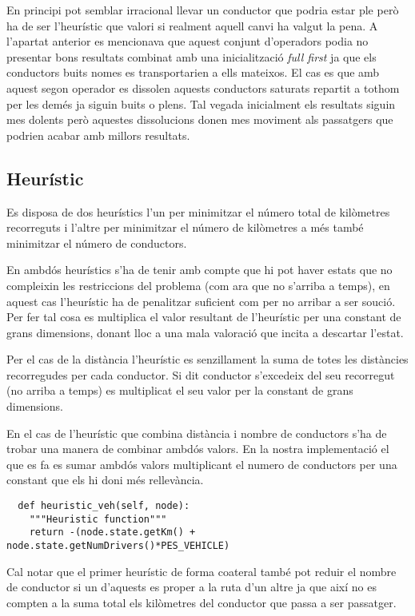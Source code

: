 En principi pot semblar irracional llevar un conductor que podria estar ple però ha de ser l'heurístic
que valori si realment aquell canvi ha valgut la pena.
A l'apartat anterior es mencionava que aquest conjunt d'operadors podia no presentar bons resultats
combinat amb una inicialització \emph{full first} ja que els conductors buits nomes es transportarien
a ells mateixos. El cas es que amb aquest segon operador es dissolen aquests conductors saturats
repartit a tothom per les demés ja siguin buits o plens. Tal vegada inicialment els resultats siguin
mes dolents però aquestes dissolucions donen mes moviment als passatgers que podrien acabar amb millors
resultats.


\subsection{Heurístic}
Es disposa de dos heurístics l'un per minimitzar el número total de kilòmetres recorreguts i l'altre per
minimitzar el número de kilòmetres a més també minimitzar el número de conductors.

En ambdós heurístics s'ha de tenir amb compte que hi pot haver estats que no compleixin les restriccions del problema
(com ara que no s'arriba a temps), en aquest cas l'heurístic ha de penalitzar suficient com per no arribar a ser so\lgem ució.
Per fer tal cosa es multiplica el valor resultant de l'heurístic per una constant de grans
dimensions, donant lloc a una mala valoració que incita a descartar l'estat.

Per el cas de la distància l'heurístic es senzillament la suma de totes les distàncies recorregudes per cada conductor.
Si dit conductor s'excedeix del seu recorregut (no arriba a temps) es multiplicat el seu valor per la constant de grans dimensions.

En el cas de l'heurístic que combina distància i nombre de conductors s'ha de trobar una manera de combinar ambdós valors.
En la nostra implementació el que es fa es sumar ambdós valors multiplicant el numero de conductors per una constant que els hi
doni més rellevància.

\begin{verbatim}
  def heuristic_veh(self, node):
    """Heuristic function"""
    return -(node.state.getKm() + node.state.getNumDrivers()*PES_VEHICLE)
\end{verbatim}

Cal notar que el primer heurístic de forma co\lgem ateral també pot reduir el nombre de conductor si un d'aquests es proper
a la ruta d'un altre ja que així no es compten a la suma total els kilòmetres del conductor que passa a ser passatger.
